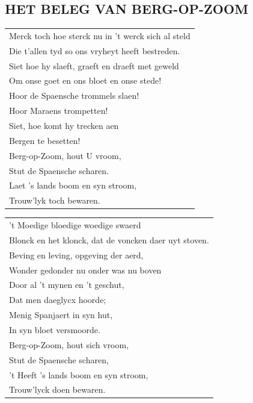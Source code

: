 \documentclass[a4paper, 14pt]{extarticle}
\begin{document}
\subsection*{HET BELEG VAN BERG-OP-ZOOM}
\begin{flushleft}
\begin{tabularx}{0.8\textwidth} {
   >{\raggedright\arraybackslash}X}
   Merck toch hoe sterck nu in ’t werck sich al steld\\
Die t’allen tyd so ons vryheyt heeft bestreden.\\
Siet hoe hy slaeft, graeft en draeft met geweld\\
Om onse goet en ons bloet en onse stede!\\
Hoor de Spaensche trommels slaen!\\
Hoor Maraens trompetten!\\
Siet, hoe komt hy trecken aen\\
Bergen te besetten!\\
Berg-op-Zoom, hout U vroom,\\
Stut de Spaensche scharen.\\
Laet ’s lands boom en syn stroom,\\
Trouw’lyk toch bewaren.\\
\end{tabularx}
\end{flushleft}\begin{flushleft}
\begin{tabularx}{0.9\textwidth} {
   >{\raggedright\arraybackslash}X}
   ’t Moedige bloedige woedige swaerd\\
Blonck en het klonck, dat de voncken daer uyt stoven.\\
Beving en leving, opgeving der aerd,\\
Wonder gedonder nu onder was nu boven\\
Door al ’t mynen en ’t geschut,\\
Dat men daeglycx hoorde;\\
Menig Spanjaert in syn hut,\\
In syn bloet versmoorde.\\
Berg-op-Zoom, hout sich vroom,\\
Stut de Spaensche scharen,\\
’t Heeft ’s lands boom en syn stroom,\\
Trouw’lyck doen bewaren.\\
\end{tabularx}
\end{flushleft}\begin{flushleft}

\end{flushleft}
\end{document}
